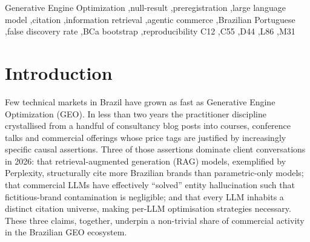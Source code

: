 \documentclass[preprint,12pt,authoryear]{elsarticle}
\begin{document}
\begin{frontmatter}
\begin{abstract}
\noindent
\textbf{Significance for agentic commerce.} The three claims examined are no longer academic. Contemporaneous work formalises autonomous LLM agents as buyer-seller negotiators \citep{Liu2026AgenticPay}, as agentic purchasers that refine preferences conversationally before recommending assortments \citep{Cao2026Solicit}, and as cross-layer economic actors with a catalogued attack surface \citep{Mao2026SoK}. In each of these regimes, \emph{which brands an LLM cites} ceases to be a metadatum and becomes an economic selection signal. The present null-report therefore bounds from below the evidence currently available to calibrate the very systems that such agents will run on top of.

\noindent
\textbf{Conclusion.} We present this as a null-report with diagnostic value: the same dataset simultaneously licenses descriptive claims about linguistic and vertical surface heterogeneity while refusing three architectural claims that commercially matter to the GEO market. We release preregistration, code and data for adversarial replication.
\end{abstract}

\begin{keyword}
Generative Engine Optimization \sep null-result \sep preregistration \sep large language model \sep citation \sep information retrieval \sep agentic commerce \sep Brazilian Portuguese \sep false discovery rate \sep BCa bootstrap \sep reproducibility
\MSC[JEL] C12 \sep C55 \sep D44 \sep L86 \sep M31
\end{keyword}

\end{frontmatter}

\section{Introduction}\label{sec:intro}

Few technical markets in Brazil have grown as fast as Generative Engine Optimization (GEO). In less than two years the practitioner discipline crystallised from a handful of consultancy blog posts into courses, conference talks and commercial offerings whose price tags are justified by increasingly specific causal assertions. Three of those assertions dominate client conversations in 2026: that retrieval-augmented generation (RAG) models, exemplified by Perplexity, structurally cite more Brazilian brands than parametric-only models; that commercial LLMs have effectively ``solved'' entity hallucination such that fictitious-brand contamination is negligible; and that every LLM inhabits a distinct citation universe, making per-LLM optimisation strategies necessary. These three claims, together, underpin a non-trivial share of commercial activity in the Brazilian GEO ecosystem.
\end{document}
